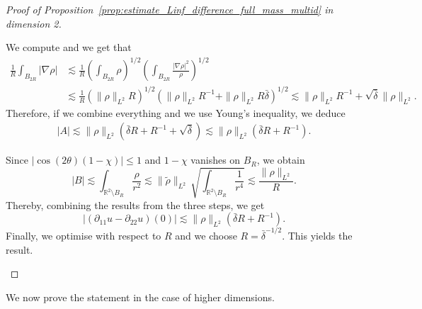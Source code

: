 \documentclass[11pt,a4paper]{article}
\numberwithin{equation}{section}
\newcommand{\R}{{\mathbb{R}}}
\theoremstyle{plain}
\theoremstyle{remark}
\newcommand {\f}{\frac}
\newcommand{\step}[1][]{%
  \if\relax\detokenize{#1}\relax
    \def\thisstep{.}%
  \else
    \def\thisstep{: \protect #1.}%
  \fi
  \item}
\begin{document}
\begin{proof}[Proof of Proposition~\ref{prop:estimate_Linf_difference_full_mass_multid} in dimension 2]
\begin{enumeratesteps}
We compute and we get that 
\begin{align*}
\f{1}{R} \int_{B_{2R}}|\nabla\rho| &\lesssim \f{1}{R}\left(\int_{B_{2R}}\rho\right)^{1/2}\left(\int_{B_{2R}}\f{|\nabla \rho|^2}{\rho}\right)^{1/2}\\
&\lesssim \f{1}{R}\left(\|\rho\|_{L^2} R\right)^{1/2}\left(\|\rho\|_{L^{2}} R^{-1} + \|\rho\|_{L^{2}} R\bar\delta\right)^{1/2}\lesssim \|\rho\|_{L^2}R^{-1} + \sqrt{\bar\delta}\|\rho\|_{L^2}.
\end{align*}
Therefore, if we combine everything and we use Young's inequality, we deduce
\begin{align*}
|A| \lesssim \|\rho\|_{L^2} (\bar\delta R+R^{-1}+ \sqrt{\bar\delta}) \lesssim \|\rho\|_{L^2} (\bar\delta R+R^{-1}).
\end{align*}

\step[An estimate for $B$]
Since $|\cos(2\theta)(1-\chi)| \le 1$ and $1-\chi$ vanishes on $B_R$, we obtain 
\[
    |B| \lesssim \int_{\R^2\setminus B_R} \f{\rho}{r^2} 
        \lesssim \|\tilde{\rho}\|_{L^2}\,\sqrt{ \int_{\R^2\setminus B_R} \f{1}{r^4} }
        \lesssim \f{\|\rho\|_{L^2}}{\,R\,}.
\]
Thereby, combining the results from the three steps, we get 
$$
|(\partial_{11}u - \partial_{22}u)(0)|\lesssim \|\rho\|_{L^2} (\bar\delta R+R^{-1}).
$$
Finally, we optimise with respect to $R$ and we choose  $R= \bar\delta^{-1/2}$. 
This yields the result.   \qedhere 
\end{enumeratesteps}
\end{proof}

We now prove the statement in the case of higher dimensions.
\end{document}
